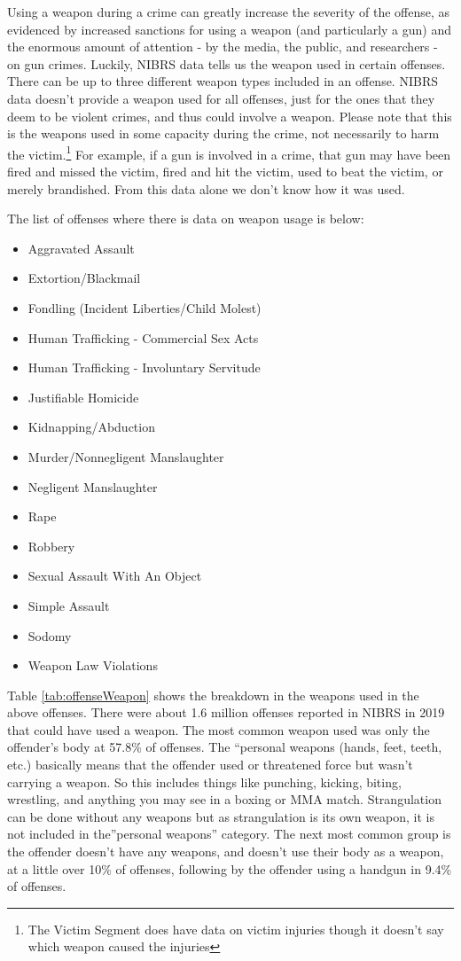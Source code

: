 \documentclass[
  12pt,
  openany]{book}
\providecommand{\tightlist}{%
  \setlength{\itemsep}{0pt}\setlength{\parskip}{0pt}}
\begin{document}
Using a weapon during a crime can greatly increase the severity of the offense, as evidenced by increased sanctions for using a weapon (and particularly a gun) and the enormous amount of attention - by the media, the public, and researchers - on gun crimes. Luckily, NIBRS data tells us the weapon used in certain offenses. There can be up to three different weapon types included in an offense. NIBRS data doesn't provide a weapon used for all offenses, just for the ones that they deem to be violent crimes, and thus could involve a weapon. Please note that this is the weapons used in some capacity during the crime, not necessarily to harm the victim.\footnote{The Victim Segment does have data on victim injuries though it doesn't say which weapon caused the injuries} For example, if a gun is involved in a crime, that gun may have been fired and missed the victim, fired and hit the victim, used to beat the victim, or merely brandished. From this data alone we don't know how it was used.

The list of offenses where there is data on weapon usage is below:

\begin{itemize}
\tightlist
\item
  Aggravated Assault
\item
  Extortion/Blackmail
\item
  Fondling (Incident Liberties/Child Molest)
\item
  Human Trafficking - Commercial Sex Acts
\item
  Human Trafficking - Involuntary Servitude
\item
  Justifiable Homicide
\item
  Kidnapping/Abduction
\item
  Murder/Nonnegligent Manslaughter
\item
  Negligent Manslaughter
\item
  Rape
\item
  Robbery
\item
  Sexual Assault With An Object
\item
  Simple Assault
\item
  Sodomy
\item
  Weapon Law Violations
\end{itemize}

Table \ref{tab:offenseWeapon} shows the breakdown in the weapons used in the above offenses. There were about 1.6 million offenses reported in NIBRS in 2019 that could have used a weapon. The most common weapon used was only the offender's body at 57.8\% of offenses. The ``personal weapons (hands, feet, teeth, etc.) basically means that the offender used or threatened force but wasn't carrying a weapon. So this includes things like punching, kicking, biting, wrestling, and anything you may see in a boxing or MMA match. Strangulation can be done without any weapons but as strangulation is its own weapon, it is not included in the''personal weapons'' category. The next most common group is the offender doesn't have any weapons, and doesn't use their body as a weapon, at a little over 10\% of offenses, following by the offender using a handgun in 9.4\% of offenses.
\end{document}
